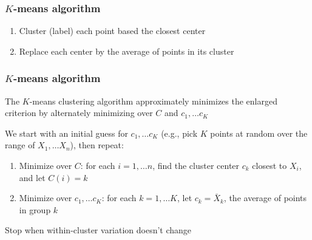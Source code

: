 \documentclass[mathserif]{beamer}
\def\blue{\color[rgb]{0,0,0.8}}
\begin{document}
\begin{frame}
\frametitle{$K$-means algorithm}

\begin{enumerate}
\item Cluster (label) each point based the closest 
center
\item Replace each center by the average of points in 
its cluster
\end{enumerate}
\vspace*{1em}
\end{frame}


\begin{frame}
\frametitle{$K$-means algorithm}
The {\blue $K$-means} clustering algorithm approximately 
minimizes the enlarged criterion 
by {\blue alternately minimizing} over $C$ and 
$c_1,\ldots c_K$

\bigskip
We start with an initial guess for $c_1,\ldots c_K$
(e.g., pick $K$ points at random over the range of
$X_1,\ldots X_n$), then repeat:
\begin{enumerate}
\item {\blue Minimize over $C$}: for each  
$i=1,\ldots n$, find the cluster center $c_k$ closest 
to $X_i$, and let $C(i)=k$
\item {\blue Minimize over $c_1,\ldots c_K$}: for each 
$k=1,\ldots K$, let $c_k = \bar{X}_k$,
the average of points in group $k$
\end{enumerate}
Stop when within-cluster variation doesn't change


\end{frame}
\end{document}
